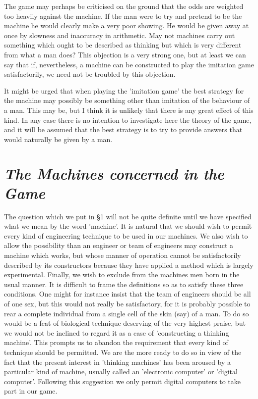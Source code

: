 \documentclass[12pt]{article}
\begin{document}
    The game may perhaps be criticised on the ground that the odds are weighted too heavily against the machine. If the man were to try and pretend to be the machine he would clearly make a very poor showing. He would be given away at once by slowness and inaccuracy in arithmetic. May not machines carry out something which ought to be described as thinking but which is very different from what a man does? This objection is a very strong one, but at least we can say that if, nevertheless, a machine can be constructed to play the imitation game satisfactorily, we need not be troubled by this objection.

    It might be urged that when playing the 'imitation game' the best strategy for the machine may possibly be something other than imitation of the behaviour of a man. This may be, but I think it is unlikely that there is any great effect of this kind. In any case there is no intention to investigate here the theory of the game, and it will be assumed that the best strategy is to try to provide answers that would naturally be given by a man.

    \section{\textit{The Machines concerned in the Game}}
    The question which we put in \S 1 will not be quite definite until we have specified what we mean by the word 'machine'. It is natural that we should wish to permit every kind of engineering technique to be used in our machines. We also wish to allow the possibility than an engineer or team of engineers may construct a machine which works, but whose manner of operation cannot be satisfactorily described by its constructors because they have applied a method which is largely experimental. Finally, we wish to exclude from the machines men born in the usual manner. It is difficult to frame the definitions so as to satisfy these three conditions. One might for instance insist that the team of engineers should be all of one sex, but this would not really be satisfactory, for it is probably possible to rear a complete individual from a single cell of the skin (say) of a man. To do so would be a feat of biological technique deserving of the very highest praise, but we would not be inclined to regard it as a case of 'constructing a thinking machine'. This prompts us to abandon the requirement that every kind of technique should be permitted. We are the more ready to do so in view of the fact that the present interest in 'thinking machines' has been aroused by a particular kind of machine, usually called an 'electronic computer' or 'digital computer'. Following this suggestion we only permit digital computers to take part in our game.
\end{document}

